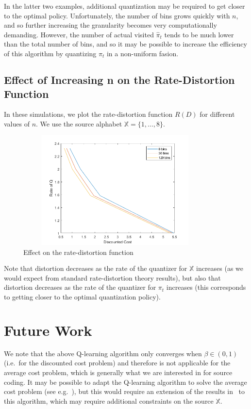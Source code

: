 \documentclass{article}
\begin{document}
In the latter two examples, additional quantization may be required to get closer to the optimal policy. Unfortunately, the number of bins grows quickly with \(n\), and so further increasing the granularity becomes very computationally demanding. However, the number of actual visited \(\hat{\pi}_t\) tends to be much lower than the total number of bins, and so it may be possible to increase the efficiency of this algorithm by quantizing \( \pi_t \) in a non-uniform fasion.

\subsection{Effect of Increasing n on the Rate-Distortion Function}
In these simulations, we plot the rate-distortion function \( R(D) \) for different values of \( n \). We use the source alphabet \( \mathbb{X} = \{1,\ldots,8\} \).

\begin{figure}[H]
    \centering
    \includegraphics[height=6cm, width=10cm]{rate_distortion.png}
    \caption{Effect on the rate-distortion function}
\end{figure}

Note that distortion decreases as the rate of the quantizer for \( \mathbb{X} \) increases (as we would expect from standard rate-distortion theory results), but also that distortion decreases as the rate of the quantizer for \( \pi_t \) increases (this corresponds to getting closer to the optimal quantization policy).

\section{Future Work}
We note that the above Q-learning algorithm only converges when \( \beta \in (0,1) \) (i.e.\ for the discounted cost problem) and therefore is not applicable for the average cost problem, which is generally what we are interested in for source coding. It may be possible to adapt the Q-learning algorithm to solve the average cost problem (see e.g.\ \cite{Abounadi}), but this would require an extension of the results in~\cite{Kara} to this algorithm, which may require additional constraints on the source \( \mathbb{X} \).
\end{document}
